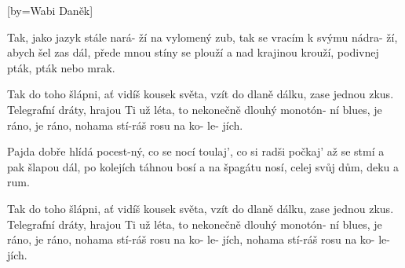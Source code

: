 [by={Wabi Daněk}]

\beginverse{}
Tak, jako jazyk stále nará- ží na vylomený zub,
tak se vracím k svýmu nádra- ží, abych šel zas dál,
přede mnou stíny se plouží a nad krajinou krouží,
podivnej pták, pták nebo mrak.
\endverse{}

\beginchorus{}
Tak do toho šlápni, ať vidíš kousek světa,
vzít do dlaně dálku, zase jednou zkus.
Telegrafní dráty, hrajou Ti už léta,
to nekonečně dlouhý monotón- ní blues,
je ráno, je ráno, nohama stí-ráš rosu na ko- le- jích.
\endchorus{}

\beginverse{}
Pajda dobře hlídá pocest-ný, co se nocí toulaj',
co si radši počkaj' až se stmí a pak šlapou dál,
po kolejích táhnou bosí a na špagátu nosí,
celej svůj dům,  deku a rum.
\endverse{}

\beginchorus{}
Tak do toho šlápni, ať vidíš kousek světa,
vzít do dlaně dálku, zase jednou zkus.
Telegrafní dráty, hrajou Ti už léta,
to nekonečně dlouhý monotón- ní blues,
je ráno, je ráno, nohama stí-ráš rosu na ko- le- jích,
nohama stí-ráš rosu na ko- le- jích.
\endchorus{}

\endsong{}
